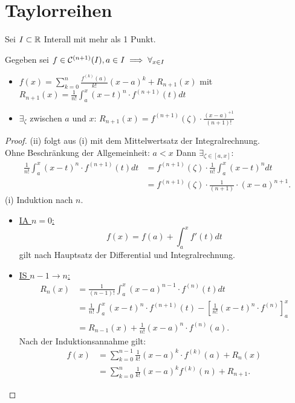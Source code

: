 \section{Taylorreihen}
Sei $I \subset \mathbb{R}$ Interall mit mehr als 1 Punkt. 

\begin{theorem}
    Gegeben sei $f \in \mathcal{C}^{(n+1)}(I), a \in I \implies \forall_{x \in I}$ 
    \begin{itemize}
        \item $f(x) = \sum_{k=0}^{n} \frac{f^{(k)}(a)}{k!}(x-a)^{k}+ R_{n+1}(x)$ mit $R_{n+1}(x)= \frac{1}{n!} \int_a^x (x-t)^{n}\cdot f^{(n+1)}(t)dt$ 
        \item $\exists_{\zeta}$ zwischen $a$ und $x$: $R_{n+1}(x) = f^{(n+1)}(\zeta) \cdot  \frac{(x-a)^{+1}}{(n+1)!}$  
    \end{itemize}
\end{theorem}
\begin{proof}
    (ii) folgt aus (i) mit dem Mittelwertsatz der Integralrechnung. \\
    Ohne Beschränkung der Allgemeinheit: $a<x$ Dann $\exists_{\zeta \in [a,x]}$:
    \begin{align*}
        \frac{1}{n!}\int_a^x (x-t)^{n}\cdot f^{(n+1)}(t)dt &= f^{(n+1)}(\zeta) \cdot \frac{1}{n!}\int_a^x (x-t)^{n}dt \\
                                                           &=f^{(n+1)}(\zeta) \cdot \frac{1}{(n+1)}\cdot (x-a)^{n+1}
    .\end{align*}
    (i) Induktion nach $n$.
    \begin{itemize}[label=$\lozenge$, itemsep=2ex]  
        \item \underline{IA $n=0$:} \\
            \[
            f(x)=f(a)+\int_a^x f'(t)dt 
            \] gilt nach Hauptsatz der Differential und Integralrechnung.
        \item \underline{IS $n-1 \to n$:} \\
            \begin{align*}
                R_n(x)&= \frac{1}{(n-1)!}\int_a^x (x-a)^{n-1}\cdot f^{(n)}(t)dt \\
                      &= \frac{1}{n!} \int_a^x (x-t)^{n}\cdot f^{(n+1)}(t) - \left[\frac{1}{n!}(x-t)^{n}\cdot f^{(n)}\right]_a^x \\
                      &= R_{n-1}(x) + \frac{1}{n!}(x-a)^{n} \cdot  f^{(n)}(a)
            .\end{align*}
            Nach der Induktionsannahme gilt:
            \begin{align*}
                f(x) &= \sum_{k=0}^{n-1} \frac{1}{k!}(x-a)^{k}\cdot f^{(k)}(a)+ R_n(x) \\
                     &= \sum_{k=0}^{n} \frac{1}{k!}(x-a)^{k} f^{(k)}(n) + R_{n+1}
            .\end{align*}
    \end{itemize}
\end{proof}

